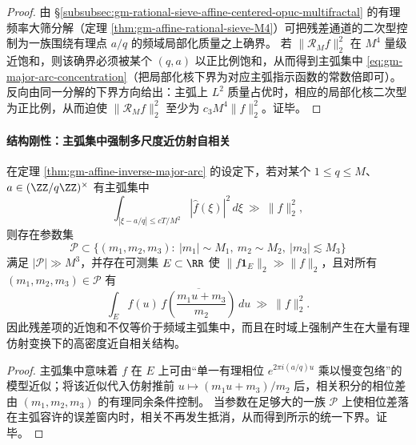 \begin{proof}
由 \S\ref{subsubsec:gm-rational-sieve-affine-centered-opuc-multifractal} 的有理频率大筛分解（定理 \ref{thm:gm-affine-rational-sieve-M4}）可把残差通道的二次型控制为一族围绕有理点 \(a/q\) 的频域局部化质量之上确界。
若 \(\|\mathcal{R}_M f\|_2^2\) 在 \(M^4\) 量级近饱和，则该确界必须被某个 \((q,a)\) 以正比例饱和，从而得到主弧集中 \eqref{eq:gm-major-arc-concentration}（把局部化核下界为对应主弧指示函数的常数倍即可）。
反向由同一分解的下界方向给出：主弧上 \(L^2\) 质量占优时，相应的局部化核二次型为正比例，从而迫使 \(\|\mathcal{R}_M f\|_2^2\) 至少为 \(c_3M^4\|f\|_2^2\)。证毕。
\end{proof}

\paragraph{结构刚性：主弧集中强制多尺度近仿射自相关}
\begin{proposition}\label{prop:gm-major-arc-rigidity-affine-autocorr}
在定理 \ref{thm:gm-affine-inverse-major-arc} 的设定下，若对某个 \(1\le q\le M\)、\(a\in(\ZZ/q\ZZ)^\times\) 有主弧集中
\[
\int_{|\xi-a/q|\le cT/M^{2}} |\widehat f(\xi)|^2\,d\xi\ \gg\ \|f\|_2^2,
\]
则存在参数集
\[
\mathcal{P}\subset\{(m_1,m_2,m_3):\ |m_1|\sim M_1,\ m_2\sim M_2,\ |m_3|\lesssim M_3\}
\]
满足 \(|\mathcal{P}|\gg M^3\)，并存在可测集 \(E\subset\RR\) 使 \(\|f\mathbf{1}_E\|_2\gg \|f\|_2\)，且对所有 \((m_1,m_2,m_3)\in\mathcal{P}\) 有
\[
\int_E f(u)\,\overline{f\!\left(\frac{m_1u+m_3}{m_2}\right)}\,du\ \gg\ \|f\|_2^2.
\]
因此残差项的近饱和不仅等价于频域主弧集中，而且在时域上强制产生在大量有理仿射变换下的高密度近自相关结构。
\end{proposition}

\begin{proof}
主弧集中意味着 \(f\) 在 \(E\) 上可由“单一有理相位 \(e^{2\pi i(a/q)u}\) 乘以慢变包络”的模型近似；将该近似代入仿射推前 \(u\mapsto(m_1u+m_3)/m_2\) 后，相关积分的相位差由 \((m_1,m_2,m_3)\) 的有理同余条件控制。
当参数在足够大的一族 \(\mathcal{P}\) 上使相位差落在主弧容许的误差窗内时，相关不再发生抵消，从而得到所示的统一下界。证毕。
\end{proof}

